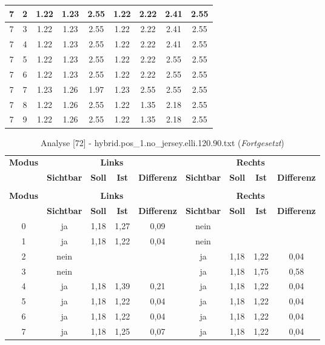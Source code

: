 \begin{longtable}{|c|c||c||c|c||c|c|c|c|}
	7 & 2 & 1.22 & 1.23 & 2.55 & 1.22 & 2.22 & 2.41 & 2.55 \\ \hline
	7 & 3 & 1.22 & 1.23 & 2.55 & 1.22 & 2.22 & 2.41 & 2.55 \\ \hline
	7 & 4 & 1.22 & 1.23 & 2.55 & 1.22 & 2.22 & 2.41 & 2.55 \\ \hline
	7 & 5 & 1.22 & 1.23 & 2.55 & 1.22 & 2.22 & 2.55 & 2.55 \\ \hline
	7 & 6 & 1.22 & 1.23 & 2.55 & 1.22 & 2.22 & 2.55 & 2.55 \\ \hline
	7 & 7 & 1.23 & 1.26 & 1.97 & 1.23 & 2.55 & 2.55 & 2.55 \\ \hline
	7 & 8 & 1.22 & 1.26 & 2.55 & 1.22 & 1.35 & 2.18 & 2.55 \\ \hline
	7 & 9 & 1.22 & 1.26 & 2.55 & 1.22 & 1.35 & 2.18 & 2.55 \\ \hline
\end{longtable}

\begin{longtable}{|c||c|c|c|c||c|c|c|c|}
	\caption{Analyse [72\textdegree] - hybrid.pos\_1.no\_jersey.elli.120.90.txt (Tab.~\ref{tab:hybrid.pos-1.no-jersey.elli.120.90.txt})} \label{tab:ana:hybrid.pos-1.no-jersey.elli.120.90.txt} \\ \hline
	 \multirow{2}{*}{\textbf{Modus}}  & \multicolumn{4}{c||}{\textbf{Links}} & \multicolumn{4}{c|}{\textbf{Rechts}} \\ \cline{2-9}
	  & \textbf{Sichtbar} & \textbf{Soll} & \textbf{\diameter{}Ist} & \textbf{Differenz} & \textbf{Sichtbar} & \textbf{Soll} & \textbf{\diameter{}Ist} & \textbf{Differenz} \\ \hline
	\endfirsthead
	\caption[]{Analyse [72\textdegree] - hybrid.pos\_1.no\_jersey.elli.120.90.txt (\emph{Fortgesetzt})} \\ \hline
	 \multirow{2}{*}{\textbf{Modus}}  & \multicolumn{4}{c||}{\textbf{Links}} & \multicolumn{4}{c|}{\textbf{Rechts}} \\ \cline{2-9}
	  & \textbf{Sichtbar} & \textbf{Soll} & \textbf{\diameter{}Ist} & \textbf{Differenz} & \textbf{Sichtbar} & \textbf{Soll} & \textbf{\diameter{}Ist} & \textbf{Differenz} \\ \hline
	\endhead
	0 & ja & 1,18 & 1,27 & 0,09 & nein &  &  &  \\ \hline
	1 & ja & 1,18 & 1,22 & 0,04 & nein &  &  &  \\ \hline
	2 & nein &  &  &  & ja & 1,18 & 1,22 & 0,04 \\ \hline
	3 & nein &  &  &  & ja & 1,18 & 1,75 & 0,58 \\ \hline
	4 & ja & 1,18 & 1,39 & 0,21 & ja & 1,18 & 1,22 & 0,04 \\ \hline
	5 & ja & 1,18 & 1,22 & 0,04 & ja & 1,18 & 1,22 & 0,04 \\ \hline
	6 & ja & 1,18 & 1,22 & 0,04 & ja & 1,18 & 1,22 & 0,04 \\ \hline
	7 & ja & 1,18 & 1,25 & 0,07 & ja & 1,18 & 1,22 & 0,04 \\ \hline
\end{longtable}
\clearpage{}

